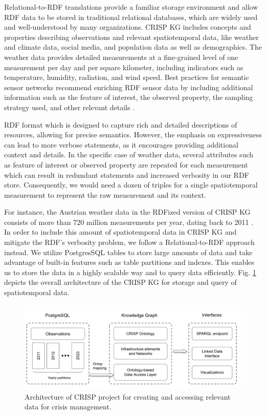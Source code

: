 \documentclass[
]{ceurart}
\begin{document}
Relational-to-RDF translations provide a familiar storage environment and allow RDF data to be stored in traditional relational databases, which are widely used and well-understood by many organizations. CRISP KG includes concepts and properties describing observations and relevant spatiotemporal data, like weather and climate data, social media, and population data as well as demographics. The weather data provides detailed measurements at a fine-grained level of one measurement per day and per square kilometer, including indicators such as temperature, humidity, radiation, and wind speed. Best practices for semantic sensor networks recommend enriching RDF sensor data by including additional information such as the feature of interest, the observed property, the sampling strategy used, and other relevant details \cite{janowicz2019sosa}. 

RDF format which is designed to capture rich and detailed descriptions of resources, allowing for precise semantics. However, the emphasis on expressiveness can lead to more verbose statements, as it encourages providing additional context and details. In the specific case of weather data, several attributes such as feature of interest or observed property are repeated for each measurement which can result in redundant statements and increased verbosity in our RDF store. Consequently, we would need a dozen of triples for a single spatiotemporal measurement to represent the raw measurement and its context. 

For instance, the Austrian weather data in the RDFized version of CRISP KG consists of more than $720$ million measurements per year,  dating back to 2011 \cite{haiden2011integrated}. In order to include this amount of spatiotemporal data in CRISP KG and mitigate the RDF's verbosity problem, we follow a Relational-to-RDF approach instead. We utilize PostgresSQL tables to store large amounts of data and take advantage of built-in features such as table partitions and indexes. This enables us to store the data in a highly scalable way and to query data efficiently. Fig. \ref{crisp_architecture} depicts the overall architecture of the CRISP KG for storage and query of spatiotemporal data.  


\begin{figure}
  \centering
  \includegraphics[width=\linewidth]{images/CRISP_architecture.png}
  \caption{Architecture of CRISP project for creating and accessing relevant data for crisis management.}
  \label{crisp_architecture}
\end{figure}
\end{document}
